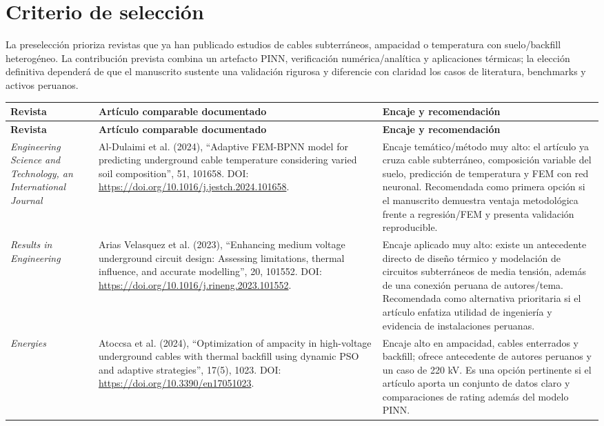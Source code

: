 \documentclass[11pt,a4paper,oneside]{report}
\begin{document}

\chapter*{Criterio de selecci\'on}
La preselecci\'on prioriza revistas que ya han publicado estudios de cables subterr\'aneos, ampacidad o temperatura con suelo/backfill heterog\'eneo. La contribuci\'on prevista combina un artefacto PINN, verificaci\'on num\'erica/anal\'itica y aplicaciones t\'ermicas; la elecci\'on definitiva depender\'a de que el manuscrito sustente una validaci\'on rigurosa y diferencie con claridad los casos de literatura, benchmarks y activos peruanos.

\small
\setlength{\tabcolsep}{3pt}
\begin{longtable}{p{2.7cm}p{4.8cm}p{6.5cm}}
\toprule
\textbf{Revista} & \textbf{Art\'iculo comparable documentado} & \textbf{Encaje y recomendaci\'on} \\
\midrule
\endfirsthead
\toprule
\textbf{Revista} & \textbf{Art\'iculo comparable documentado} & \textbf{Encaje y recomendaci\'on} \\
\midrule
\endhead
\textit{Engineering Science and Technology, an International Journal} & Al-Dulaimi et al. (2024), ``Adaptive FEM-BPNN model for predicting underground cable temperature considering varied soil composition'', 51, 101658. DOI: \url{https://doi.org/10.1016/j.jestch.2024.101658}. & Encaje tem\'atico/m\'etodo muy alto: el art\'iculo ya cruza cable subterr\'aneo, composici\'on variable del suelo, predicci\'on de temperatura y FEM con red neuronal. Recomendada como primera opci\'on si el manuscrito demuestra ventaja metodol\'ogica frente a regresi\'on/FEM y presenta validaci\'on reproducible. \\
\textit{Results in Engineering} & Arias Velasquez et al. (2023), ``Enhancing medium voltage underground circuit design: Assessing limitations, thermal influence, and accurate modelling'', 20, 101552. DOI: \url{https://doi.org/10.1016/j.rineng.2023.101552}. & Encaje aplicado muy alto: existe un antecedente directo de dise\~no t\'ermico y modelaci\'on de circuitos subterr\'aneos de media tensi\'on, adem\'as de una conexi\'on peruana de autores/tema. Recomendada como alternativa prioritaria si el art\'iculo enfatiza utilidad de ingenier\'ia y evidencia de instalaciones peruanas. \\
\textit{Energies} & Atoccsa et al. (2024), ``Optimization of ampacity in high-voltage underground cables with thermal backfill using dynamic PSO and adaptive strategies'', 17(5), 1023. DOI: \url{https://doi.org/10.3390/en17051023}. & Encaje alto en ampacidad, cables enterrados y backfill; ofrece antecedente de autores peruanos y un caso de 220 kV. Es una opci\'on pertinente si el art\'iculo aporta un conjunto de datos claro y comparaciones de rating adem\'as del modelo PINN. \\
\bottomrule
\end{longtable}
\end{document}
